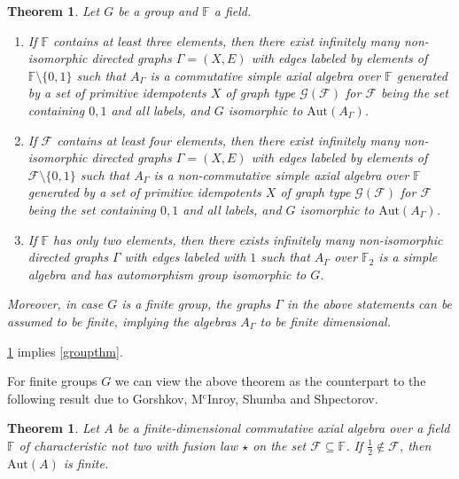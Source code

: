 \documentclass[oneside,a4paper]{amsart} %
\newtheorem{theorem}[proposition]{Theorem}
\theoremstyle{definition}
\begin{document}
\begin{theorem}\label{fruchttheorem}
Let $G$ be a  group and $\mathbb{F}$ a field.

\begin{enumerate}
\item If $\mathbb{F}$ contains at least three elements, then
there exist infinitely many non-isomorphic  directed graphs $\Gamma=(X,E)$ with edges labeled by elements of $\mathbb{F}\setminus\{0,1\}$
such that $A_\Gamma$ is a  commutative simple axial  algebra over $\mathbb{F}$ generated by a set of primitive idempotents $X$
of graph type $\mathcal{G}(\mathcal{F})$ for  $\mathcal{F}$ being the set containing $0,1$ and all labels, and $G$ isomorphic to $\mathrm{Aut}(A_\Gamma)$.
\item
If $\mathcal{F}$ contains at least four elements, then there exist infinitely many non-isomorphic  directed graphs $\Gamma=(X,E)$ with edges labeled by elements of $\mathcal{F}\setminus \{0,1\}$
such that $A_\Gamma$ is a  non-commutative simple  axial algebra over $\mathbb{F}$ generated by a set of primitive idempotents $X$
of graph type $\mathcal{G}(\mathcal{F})$ for  $\mathcal{F}$ being the set containing $0,1$ and all labels, and $G$ isomorphic to $\mathrm{Aut}(A_\Gamma)$.
\item
If $\mathbb{F}$ has only two elements, then there exists infinitely many non-isomorphic  directed graphs $\Gamma$ with edges labeled with $1$ such that $A_\Gamma$ over $\mathbb{F}_2$ is a  simple 
algebra and has automorphism group isomorphic to $G$.
\end{enumerate}

Moreover, in case $G$ is a finite group, the graphs $\Gamma$ in the above statements can be
assumed to be finite, implying the algebras $A_\Gamma$ to be finite dimensional.
\end{theorem}

\cref{fruchttheorem} implies \cref{groupthm}.

For finite groups $G$ we can view the above theorem as the counterpart to the following result
due to  Gorshkov, M$^\mathrm{c}$Inroy, Shumba and Shpectorov.

\begin{theorem}\cite{gorshkov2023automorphism}
Let $A$ be a finite-dimensional commutative axial algebra over a field $\mathbb{F}$ of characteristic
not two with fusion law $\star$ on the set $\mathcal{F}\subseteq \mathbb{F}$. If $\frac{1}{2}\not\in \mathcal{F}$, then $\mathrm{Aut}(A)$ is finite.
\end{theorem} 
\end{document}
